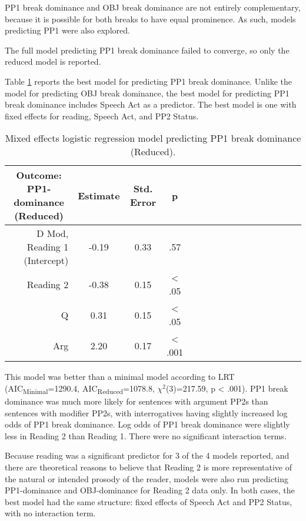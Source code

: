 \documentclass[11pt,oneside]{book}
\begin{document}
PP1 break dominance and OBJ break dominance are not entirely complementary, because it is possible for both breaks to have equal prominence. As such, models predicting PP1 were also explored.

The full model predicting PP1 break dominance failed to converge, so only the reduced model is reported.

Table \ref{tab:pdom} reports the best model for predicting PP1 break dominance. Unlike the model for predicting OBJ break dominance, the best model for predicting PP1 break dominance includes Speech Act as a predictor. The best model is one with fixed effects for reading, Speech Act, and PP2 Status.

\begin{table}[!h]

\caption{\label{tab:pdom}Mixed effects logistic regression model predicting PP1 break dominance (Reduced).}
\centering
\begin{tabular}{rcccrcccrcccrccc}
\toprule
\multicolumn{1}{c}{Outcome: PP1-dominance (Reduced)} & \multicolumn{1}{c}{Estimate} & \multicolumn{1}{c}{Std. Error} & \multicolumn{1}{c}{p}\\
\midrule
D Mod, Reading 1 (Intercept) & -0.19 & 0.33 & .57\\
Reading 2 & -0.38 & 0.15 & < .05\\
Q & 0.31 & 0.15 & < .05\\
Arg & 2.20 & 0.17 & < .001\\
\bottomrule
\end{tabular}
\end{table}

This model was better than a minimal model according to LRT (AIC\textsubscript{Minimal}=1290.4, AIC\textsubscript{Reduced}=1078.8, \(\chi^2\)(3)=217.59, p \textless{} .001). PP1 break dominance was much more likely for sentences with argument PP2s than sentences with modifier PP2s, with interrogatives having slightly increased log odds of PP1 break dominance. Log odds of PP1 break dominance were slightly less in Reading 2 than Reading 1. There were no significant interaction terms.

Because reading was a significant predictor for 3 of the 4 models reported, and there are theoretical reasons to believe that Reading 2 is more representative of the natural or intended prosody of the reader, models were also run predicting PP1-dominance and OBJ-dominance for Reading 2 data only. In both cases, the best model had the same structure: fixed effects of Speech Act and PP2 Status, with no interaction term.
\end{document}
